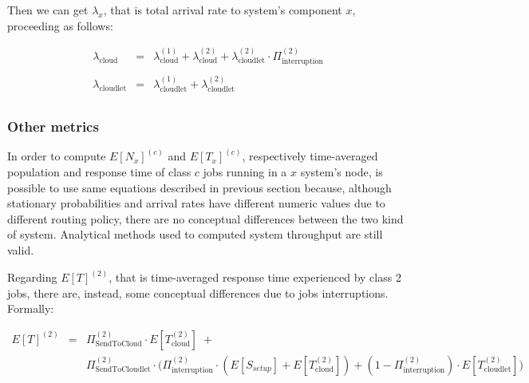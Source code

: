 \documentclass[10pt,a4paper]{article}
\begin{document}
Then we can get $\lambda_x$, that is total arrival rate to system's component $x$, proceeding as follows:

\begin{equation}
\begin{array} {rcl}

\lambda_{\text{cloud}} & = & \lambda_{\text{cloud}}^{(1)} + \lambda_{\text{cloud}}^{(2)} + \lambda_{\text{cloudlet}}^{(2)} \cdot \Pi_{\text{interruption}}^{(2)} \\\\

\lambda_{\text{cloudlet}} & = & \lambda_{\text{cloudlet}}^{(1)} + \lambda_{\text{cloudlet}}^{(2)} \\
\end{array}
\end{equation}

\subsubsection{Other metrics}

In order to compute $E[N_x]^{(c)}$ and $E[T_x]^{(c)}$, respectively time-averaged population and response time of class $c$ jobs running in a $x$ system's node, is possible to  use same equations described in previous section because, although stationary probabilities and arrival rates have different numeric values due to different routing policy, there are no conceptual differences between the two kind of system.
Analytical methods used to computed system throughput are still valid.

Regarding $E[T]^{(2)}$, that is time-averaged response time experienced by class 2 jobs, there are, instead, some conceptual differences due to jobs interruptions. Formally:


\begin{equation}
\begin{array} {lcl} 
E[T]^{(2)}  & = & \Pi_{\text{SendToCloud}}^{(2)} \cdot E[T_{\text{cloud}}^{(2)}] \; +  \\
& & \Pi_{\text{SendToCloudlet}}^{(2)} \cdot \bigg( \Pi_{\text{interruption}}^{(2)}\cdot(E[S_{setup}] + E[T_{\text{cloud}}^{(2)}]) + (1-\Pi_{\text{interruption}}^{(2)}) \cdot E[T_{\text{cloudlet}}^{(2)}] \bigg)



\end{array}
\end{equation}
\end{document}
